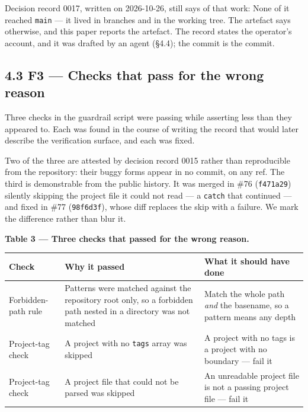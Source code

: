 \documentclass[11pt,a4paper]{article}
\begin{document}
Decision record 0017, written on 2026-10-26, still says of that work: \textquotedbl{}None of it reached \texttt{main} --- it lived in branches and in the working tree.\textquotedbl{} The artefact says otherwise, and this paper reports the artefact. The record states the operator's account, and it was drafted by an agent (\S{}4.4); the commit is the commit.

\subsection*{4.3 F3 --- Checks that pass for the wrong reason}

Three checks in the guardrail script were passing while asserting less than they appeared to. Each was found in the course of writing the record that would later describe the verification surface, and each was fixed.

Two of the three are attested by decision record 0015 rather than reproducible from the repository: their buggy forms appear in no commit, on any ref. The third is demonstrable from the public history. It was merged in \#76 (\texttt{f471a29}) silently skipping the project file it could not read --- a \texttt{catch} that continued --- and fixed in \#77 (\texttt{98f6d3f}), whose diff replaces the skip with a failure. We mark the difference rather than blur it.

\textbf{Table 3 --- Three checks that passed for the wrong reason.}

\begin{tabular}{@{}>{\raggedright\arraybackslash}p{}>{\raggedright\arraybackslash}p{}>{\raggedright\arraybackslash}p{}@{}}
\toprule
\textbf{Check} & \textbf{Why it passed} & \textbf{What it should have done} \\
\midrule
Forbidden-path rule & Patterns were matched against the repository root only, so a forbidden path nested in a directory was not matched & Match the whole path \emph{and} the basename, so a pattern means any depth \\
Project-tag check & A project with no \texttt{tags} array was skipped & A project with no tags is a project with no boundary --- fail it \\
Project-tag check & A project file that could not be parsed was skipped & An unreadable project file is not a passing project file --- fail it \\
\bottomrule
\end{tabular}
\end{document}
